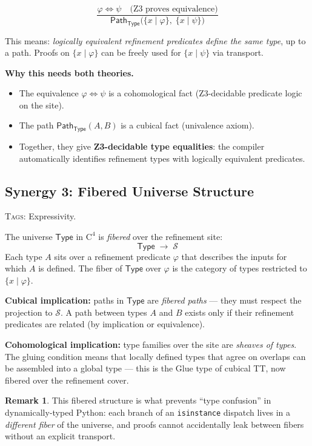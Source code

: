 \documentclass[11pt,a4paper]{article}
\theoremstyle{definition}
\newtheorem{remark}[definition]{Remark}
\theoremstyle{plain}
\newcommand{\Path}{\mathsf{Path}}
\newcommand{\Type}{\mathsf{Type}}
\newcommand{\site}{\mathcal{S}}
\begin{document}
\[
  \frac{
    \varphi \Leftrightarrow \psi
    \quad\text{(Z3 proves equivalence)}
  }{
    \Path_\Type\bigl(\{x \mid \varphi\},\; \{x \mid \psi\}\bigr)
  }
\]

This means: \emph{logically equivalent refinement predicates define
the same type}, up to a path.  Proofs on $\{x \mid \varphi\}$ can be
freely used for $\{x \mid \psi\}$ via transport.

\textbf{Why this needs both theories.}
\begin{itemize}
\item The equivalence $\varphi \Leftrightarrow \psi$ is a
  cohomological fact (Z3-decidable predicate logic on the site).
\item The path $\Path_\Type(A, B)$ is a cubical fact (univalence
  axiom).
\item Together, they give \textbf{Z3-decidable type equalities}:
  the compiler automatically identifies refinement types with
  logically equivalent predicates.
\end{itemize}


\subsection{Synergy 3: Fibered Universe Structure}
\label{sec:syn-fibered-universe}

\textsc{Tags:} Expressivity.

\medskip\noindent
The universe $\Type$ in $\mathrm{C}^4$ is \emph{fibered} over the
refinement site:
\[
  \Type \;\to\; \site
\]
Each type $A$ sits over a refinement predicate $\varphi$ that
describes the inputs for which $A$ is defined.  The fiber of
$\Type$ over $\varphi$ is the category of types restricted to
$\{x \mid \varphi\}$.

\textbf{Cubical implication:} paths in $\Type$ are \emph{fibered
paths} --- they must respect the projection to $\site$.  A path
between types $A$ and $B$ exists only if their refinement predicates
are related (by implication or equivalence).

\textbf{Cohomological implication:} type families over the site
are \emph{sheaves of types}.  The gluing condition means that
locally defined types that agree on overlaps can be assembled into
a global type --- this is the \textsf{Glue} type of cubical TT,
now fibered over the refinement cover.

\begin{remark}
This fibered structure is what prevents ``type confusion'' in
dynamically-typed Python: each branch of an \texttt{isinstance}
dispatch lives in a \emph{different fiber} of the universe, and
proofs cannot accidentally leak between fibers without an explicit
transport.
\end{remark}
\end{document}
